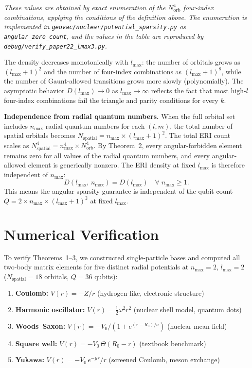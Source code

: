 \documentclass[twocolumn,pra,amsmath,amssymb,superscriptaddress]{revtex4-2}
\begin{document}
\textit{These values are obtained by exact enumeration of the
$N_{\mathrm{orb}}^4$ four-index combinations, applying the conditions
of the definition above.  The enumeration is implemented in
\texttt{geovac/nuclear/potential\_sparsity.py} as
\texttt{angular\_zero\_count}, and the values in the table are
reproduced by \texttt{debug/verify\_paper22\_lmax3.py}.}

The density decreases monotonically with $l_{\max}$: the number of
orbitals grows as $(l_{\max}+1)^2$ and the number of four-index
combinations as $(l_{\max}+1)^8$, while the number of Gaunt-allowed
transitions grows more slowly (polynomially).  The asymptotic
behavior $D(l_{\max}) \to 0$ as $l_{\max} \to \infty$ reflects the
fact that most high-$l$ four-index combinations fail the triangle
and parity conditions for every $k$.

\medskip
\noindent\textbf{Independence from radial quantum numbers.}
When the full orbital set includes $n_{\max}$ radial quantum numbers
for each $(l, m)$, the total number of spatial orbitals becomes
$N_{\mathrm{spatial}} = n_{\max} \times (l_{\max}+1)^2$.  The total
ERI count scales as $N_{\mathrm{spatial}}^4 = n_{\max}^4 \times
N_{\mathrm{orb}}^4$.  By Theorem~2, every angular-forbidden element
remains zero for all values of the radial quantum numbers, and every
angular-allowed element is generically nonzero.  The ERI density at
fixed $l_{\max}$ is therefore independent of $n_{\max}$:
\begin{equation}
  D(l_{\max},\, n_{\max}) = D(l_{\max}) \quad \forall\; n_{\max} \geq 1.
  \label{eq:nmax_independence}
\end{equation}
This means the angular sparsity guarantee is independent of the
qubit count $Q = 2 \times n_{\max} \times (l_{\max}+1)^2$ at fixed
$l_{\max}$.

\section{Numerical Verification}
\label{sec:verification}

To verify Theorems~1--3, we constructed single-particle bases and
computed all two-body matrix elements for five distinct radial
potentials at $n_{\max} = 2$, $l_{\max} = 2$ ($N_{\mathrm{spatial}} = 18$
orbitals, $Q = 36$ qubits):

\begin{enumerate}
\item \textbf{Coulomb:} $V(r) = -Z/r$ (hydrogen-like,
  electronic structure)
\item \textbf{Harmonic oscillator:} $V(r) = \tfrac{1}{2}\omega^2 r^2$
  (nuclear shell model, quantum dots)
\item \textbf{Woods--Saxon:}
  $V(r) = -V_0 / (1 + e^{(r-R_0)/a})$ (nuclear mean field)
\item \textbf{Square well:}
  $V(r) = -V_0\, \Theta(R_0 - r)$ (textbook benchmark)
\item \textbf{Yukawa:}
  $V(r) = -V_0\, e^{-\mu r}/r$ (screened Coulomb, meson exchange)
\end{enumerate}
\end{document}

